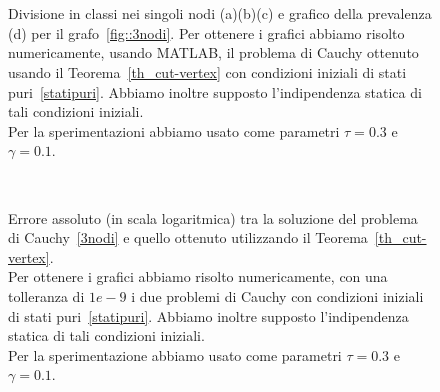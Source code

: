 \begin{figure}[!htb]
\centering
\subfloat[][Nodo 1.]
	{\resizebox{0.45\textwidth}{!}{}}
 \quad 
\subfloat[][Nodo 2.]
{\resizebox{0.45\textwidth}{!}{ }}
\\
\subfloat[][Nodo 3.]
{\resizebox{0.45\textwidth}{!}
{}
}
\quad 
\subfloat[][Prevalenza.]
{\resizebox{0.45\textwidth}{!}{ }}
\\

\caption[Sperimentazione in MATLAB relativo al grafo~\ref{fig::3nodi}]{Divisione in classi nei singoli nodi (a)(b)(c) e grafico della prevalenza (d) per il grafo~\ref{fig::3nodi}.  Per ottenere i grafici abbiamo risolto numericamente,  usando MATLAB,  il problema di Cauchy ottenuto usando il Teorema~\ref{th_cut-vertex} con condizioni iniziali  di stati puri~\eqref{statipuri}.  Abbiamo inoltre supposto l'indipendenza statica di tali condizioni iniziali.\\
Per la sperimentazioni abbiamo usato come parametri $\tau= 0.3$ e $\gamma =0.1 $.}\label{fig::3nodicut}

\end{figure}
\begin{figure}[!htb]
	\centering
	\subfloat[][Nodo 1.]
	{\resizebox{0.45\textwidth}{!}{}}
 \quad 
\subfloat[][Nodo 2.]
{\resizebox{0.45\textwidth}{!}{ }}
\\
\subfloat[][Nodo 3.]
{\resizebox{0.45\textwidth}{!}
{}}
\caption[Errori assoluti relativi al grafo~\ref{fig::3nodi} tra modello esatto e cut-vertex] {Errore assoluto (in scala logaritmica) tra la soluzione del problema di Cauchy~\eqref{3nodi} e quello ottenuto utilizzando il Teorema~\ref{th_cut-vertex}.\\
Per ottenere i grafici abbiamo risolto numericamente, con una tolleranza di $1e-9$ i due problemi di Cauchy con condizioni iniziali di stati puri~\eqref{statipuri}. Abbiamo inoltre supposto l'indipendenza statica di tali condizioni iniziali.\\
Per la sperimentazione abbiamo usato come parametri $\tau = 0.3$ e $\gamma = 0.1$. }
\label{fig::errori3nodi}
\end{figure}


